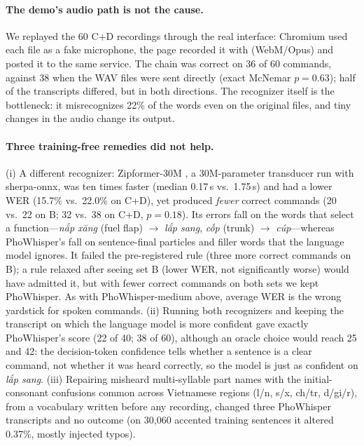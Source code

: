 \paragraph{The demo's audio path is not the cause.} We replayed the 60 C+D recordings through the real interface: Chromium
used each file as a fake microphone, the page recorded it with  (WebM/Opus) and posted it to the same
service. The chain was correct on 36 of 60 commands, against 38 when the WAV files were sent directly (exact McNemar
$p=0.63$); half of the transcripts differed, but in both directions. The recognizer itself is the bottleneck: it misrecognizes
22\% of the words even on the original files, and tiny changes in the audio change its output.

\paragraph{Three training-free remedies did not help.} (i) A different recognizer: Zipformer-30M
\citep{yao2023zipformer,hynt2025zipformervi}, a 30M-parameter transducer run with sherpa-onnx, was ten times faster (median
0.17\,s vs.\ 1.75\,s) and had a lower WER (15.7\% vs.\ 22.0\% on C+D), yet produced \emph{fewer} correct commands (20 vs.\ 22
on B; 32 vs.\ 38 on C+D, $p=0.18$). Its errors fall on the words that select a function---\textit{nắp xăng} (fuel flap)
$\rightarrow$ \textit{lắp sang}, \textit{cốp} (trunk) $\rightarrow$ \textit{cúp}---whereas PhoWhisper's fall on sentence-final
particles and filler words that the language model ignores. It failed the pre-registered rule (three more correct commands
on B); a rule relaxed after seeing set B (lower WER, not significantly worse) would have admitted it, but with fewer correct
commands on both sets we kept PhoWhisper. As with PhoWhisper-medium above, average WER is the wrong yardstick for spoken
commands. (ii) Running both recognizers and keeping the transcript on which the language model is more
confident gave exactly PhoWhisper's score (22 of 40; 38 of 60), although an oracle choice would reach 25 and 42: the
decision-token confidence tells whether a sentence is a clear command, not whether it was heard correctly, so the model is
just as confident on \textit{lắp sang}. (iii) Repairing misheard multi-syllable part names with the initial-consonant
confusions common across Vietnamese regions (l/n, s/x, ch/tr, d/gi/r), from a vocabulary written before any recording, changed
three PhoWhisper transcripts and no outcome (on 30,060 accented training sentences it altered 0.37\%, mostly injected
typos).


